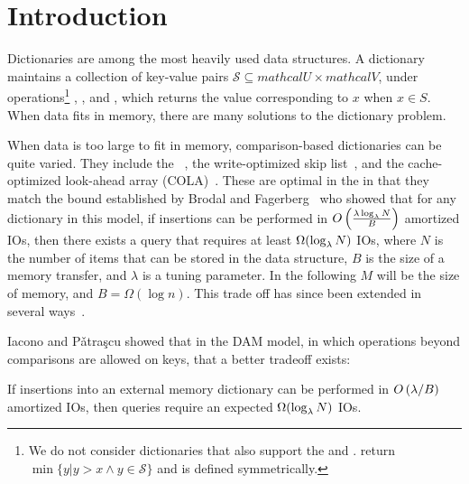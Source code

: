 \section{Introduction}\label{sec:boa-intro}

Dictionaries are among the most heavily used data structures. A
dictionary maintains a collection of key-value pairs
$\mathcal{S}\subseteq mathcal{U}\times mathcal{V}$, under operations\footnote{We do
  not consider dictionaries that also support the  and
  .   return
  $\min\{y| y>x \land y\in\mathcal{S}\}$ and  is defined
  symmetrically.}  , , and
, which returns the value corresponding to $x$ when
$x\in S$.  When data fits in memory, there are many solutions to the
dictionary problem.

When data is too large to fit in memory, comparison-based dictionaries
can be quite varied.  They include the
\bet~\cite{DBLP:conf/soda/BrodalF03}, the write-optimized skip
list~\cite{DBLP:conf/pods/BenderFJMMPX17}, and the cache-optimized
look-ahead array
(COLA)~\cite{DBLP:conf/spaa/BenderFFFKN07,DBLP:journals/pvldb/BenderFJKKMMSSZ12,DBLP:conf/esa/BenderCDF02}.
These are optimal in the  in
that they match the bound established by Brodal and
Fagerberg~\cite{DBLP:conf/soda/BrodalF03} who showed that for any
dictionary in this model, if insertions can be performed in
$O\left(\frac{\lambda\log_{\lambda} N}{B}\right)$ amortized IOs, then
there exists a query that requires at least $\Omega(\log_\lambda N)$
IOs, where $N$ is the number of items that can be stored in the data
structure, $B$ is the size of a memory transfer, and $\lambda$ is a
tuning parameter.  In the following $M$ will be the size of memory,
and $B = \Omega(\log n)$.  This trade off has since been extended in
several
ways~\cite{DBLP:conf/esa/BenderFGMMT14,DBLP:conf/soda/AfshaniBFFGT17}.

Iacono and P\v{a}tra\c{s}cu showed that in the DAM model, in which
operations beyond comparisons are allowed on keys, that a better
tradeoff exists:
\begin{theorem}\label{thm:ip-lower-bound}
  If insertions into an external memory dictionary can be performed in
  $O\left(\lambda/B\right)$ amortized IOs, then queries require an
  expected $\Omega(\log_\lambda N)$ IOs.
\end{theorem}

